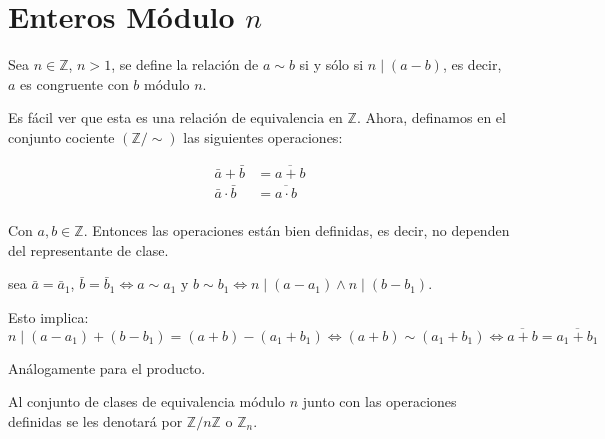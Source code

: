 \section{Enteros Módulo \texorpdfstring{$n$}{n}}

\begin{defi}
	Sea $n \in \mathbb{Z}$, $n > 1$, se define la relación de $a \sim b$ si y sólo si $n \mid (a - b)$, es decir, $a$ es congruente con $b$ módulo $n$.
\end{defi}

Es fácil ver que esta es una relación de equivalencia en $\mathbb{Z}$. Ahora, definamos en el conjunto cociente $(\mathbb{Z}/\sim)$ las siguientes operaciones:

\begin{align*}
	\bar{a} + \bar{b}     & = \overline{a + b}     \\
	\bar{a} \cdot \bar{b} & = \overline{a \cdot b} \\
\end{align*}

Con $a, b \in \mathbb{Z}$. Entonces las operaciones están bien definidas, es decir, no dependen del representante de clase.

\begin{enefecto}
	sea $\bar{a}=\bar{a}_1$, $\bar{b}=\bar{b}_1 \iff a \sim a_1 \text{ y } b \sim b_1 \iff n \mid (a-a_1) \land n \mid (b-b_1)$.

	Esto implica:
	\begin{equation*}
		n \mid (a-a_1) + (b-b_1) = (a+b) - (a_1+b_1) \iff (a+b) \sim (a_1+b_1) \iff \overline{a+b} = \overline{a_1+b_1}
	\end{equation*}

	Análogamente para el producto.

\end{enefecto}

Al conjunto de clases de equivalencia módulo $n$ junto con las operaciones definidas se les denotará por $\mathbb{Z}/n\mathbb{Z}$ o $\mathbb{Z}_n$.
